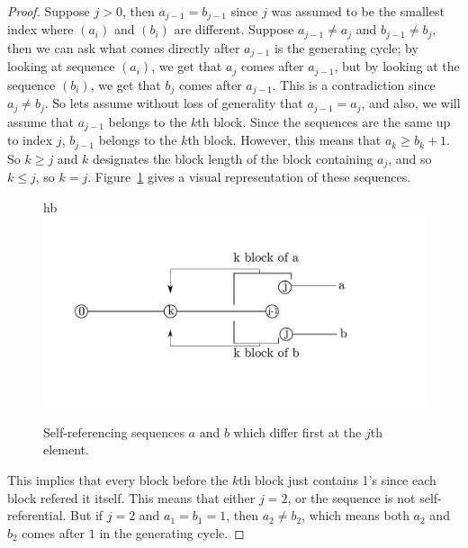 \documentclass[runningheads,a4paper]{llncs}
\begin{document}
\begin{proof}
Suppose $j > 0$, then $a_{j-1} = b_{j-1}$ since $j$ was assumed to be the smallest index where $(a_i)$ and $(b_i)$ are different. Suppose $a_{j-1} \neq a_j$ and $b_{j-1} \neq b_j$, then we can ask what comes directly after $a_{j-1}$ is the generating cycle; by looking at sequence $(a_i)$, we get that $a_j$ comes after $a_{j-1}$, but by looking at the sequence $(b_i)$, we get that $b_j$ comes after $a_{j-1}$. This is a contradiction since $a_j \neq b_j$. So lets assume without loss of generality that $a_{j-1} = a_j$, and also, we will assume that $a_{j-1}$ belongs to the $k$th block. Since the sequences are the same up to index $j$, $b_{j-1}$ belongs to the $k$th block. However, this means that $a_k \geq b_k + 1$. So $k \geq j$ and $k$ designates the block length of the block containing $a_j$, and so $k\leq j$, so $k=j$. Figure~\ref{fig:unequalsequences} gives a visual representation of these sequences.

\begin{figure}{hb}
\label{fig:unequalsequences}
\center
\includegraphics[width=0.5\linewidth]{lemma1.pdf}
\caption{Self-referencing sequences $a$ and $b$ which differ first at the $j$th element.}
\end{figure}

This implies that every block before the $k$th block just contains 1's since each block refered it itself. This means that either $j = 2$, or the sequence is not self-referential. But if $j=2$ and $a_1 = b_1 = 1$, then $a_2 \neq b_2$, which means both $a_2$ and $b_2$ comes after $1$ in the generating cycle. 
\end{proof}
\end{document}
